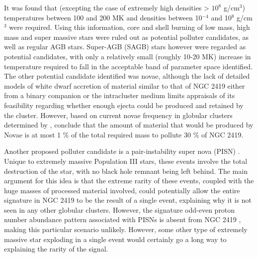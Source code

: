 \documentclass[a4paper,fleqn,usenatbib]{mnras}
\newcommand{\todo}[1]{\textcolor{red}{#1}}
\begin{document}
It was found that (excepting the case of extremely high densities > $10^8$ g/cm$^3$) temperatures between 100 and 200 MK and densities between 10$^{-4}$ and 10$^8$ g/cm$^3$ were required. Using this information, core and shell burning of low mass, high mass and super massive stars were ruled out as potential polluter candidates, as well as regular AGB stars. Super-AGB (SAGB) stars however were regarded as potential candidates, with only a relatively small (roughly 10-20 MK) increase in temperature required to fall in the acceptable band of parameter space identified. The other potential candidate identified was novae, although the lack of detailed models of white dwarf accretion of material similar to that of NGC 2419 either from a binary companion or the intracluster medium limits appraisals of its feasibility regarding whether enough ejecta could be produced and retained by the cluster. However, based on current novae frequency in globular clusters determined by \cite{kato2013novae}, \cite{iliadis2016} conclude that the amount of material that would be produced by Novae is at most 1 \% of the total required mass to pollute 30 \% of NGC 2419.


Another proposed  polluter candidate is a pair-instability super nova (PISN) \citep[PISN;][]{carretta2013}. Unique to extremely massive Population III stars, these events involve the total destruction of the star, with no black hole remnant being left behind. The main argument for this idea is that the extreme rarity of these events, coupled with the huge masses of processed material involved, could potentially allow the entire signature in NGC 2419 to be the result of a single event, explaining why it is not seen in any other globular clusters. However, the signature odd-even proton number abundance pattern associated with PISNs is absent from NGC 2419 \citep{cohenkirby2012}, making this particular scenario unlikely. However, some other type of extremely massive star exploding in a single event would certainly go a long way to explaining the rarity of the signal.


\end{document}
